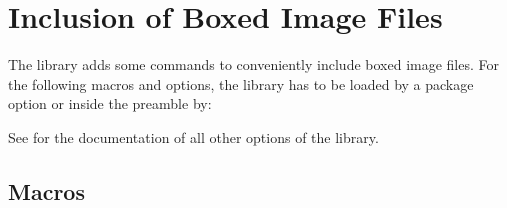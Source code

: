 \clearpage
\section{Inclusion of Boxed Image Files}\label{sec:includegraphics}%
%
The  library adds some commands to conveniently include
boxed image files.
For the following macros and options, the  library has to be loaded
by a package option or inside the preamble by:
\begin{dispListing}
\end{dispListing}

See  for the documentation of all other options of the  library.

\subsection{Macros}

